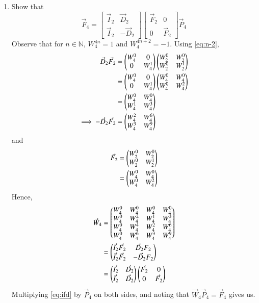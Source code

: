 \documentclass[journal,12pt,twocolumn]{IEEEtran}
\renewcommand\thesection{\arabic{section}}
\begin{document}
\begin{enumerate}[label=\arabic*.,ref=\thesection.\theenumi]
	\item Show that 
	\begin{equation}
		\vec{F}_{4}=
		\begin{bmatrix}
			\vec{I}_{2} & \vec{D}_{2} \\
			\vec{I}_{2} & -\vec{D}_{2}
		\end{bmatrix}
		\begin{bmatrix}
			\vec{F}_{2} & 0 \\
			0 & \vec{F}_{2}
		\end{bmatrix}
		\vec{P}_{4}
	\end{equation}
	\solution Observe that for $n \in \mathbb{N}$, $W_4^{4n} = 1$ and $W_4^{4n + 2} = -1$. Using \eqref{eq:n-2},
	\begin{align}
		\vec{D}_2\vec{F}_2 &= \begin{pmatrix}W_{4}^{0} & 0 \\ 0 & W_{4}^{1}\end{pmatrix}\begin{pmatrix}W_{2}^{0} & W_{2}^{0} \\ W_{2}^{0} & W_{2}^{1}\end{pmatrix} \\
		&= \begin{pmatrix}W_{4}^{0} & 0 \\ 0 & W_{4}^{1}\end{pmatrix}\begin{pmatrix}W_{4}^{0} & W_{4}^{0} \\ W_{4}^{0} & W_{4}^{2}\end{pmatrix} \\
		&= \begin{pmatrix}W_{4}^{0} & W_{4}^{0} \\ W_{4}^{1} & W_{4}^{3}\end{pmatrix} \label{eq:fft-df1} \\
		\implies -\vec{D}_2\vec{F}_2 &= \begin{pmatrix}W_{4}^{2} & W_{4}^{6} \\ W_{4}^{3} & W_{4}^{9}\end{pmatrix} \label{eq:fft-df2}
	\end{align}
	and
	\begin{align}
		\vec{F}_2 &= \begin{pmatrix}W_{2}^{0} & W_{2}^{0} \\ W_{2}^{0} & W_{2}^{1}\end{pmatrix} \\
		&= \begin{pmatrix}W_{4}^{0} & W_{4}^{0} \\ W_{4}^{0} & W_{4}^{2}\end{pmatrix}
	\end{align}
	Hence,
	\begin{align}
		\vec{W}_4 &= \begin{pmatrix}W_{4}^{0} & W_{4}^{0} & W_{4}^{0} & W_{4}^{0} \\
			W_{4}^{0} & W_{4}^{2} & W_{4}^{1} & W_{4}^{3} \\
			W_{4}^{0} & W_{4}^{4} & W_{4}^{2} & W_{4}^{6} \\
			W_{4}^{0} & W_{4}^{6} & W_{4}^{3} & W_{4}^{9} 
		\end{pmatrix} \label{eq:fft-permutation} \\
		&= \begin{pmatrix}\vec{I}_2\vec{F}_2 & \vec{D}_2{F}_2 \\ \vec{I}_2\vec{F}_2 & -\vec{D}_2{F}_2\end{pmatrix} \\
		&= \begin{pmatrix}\vec{I}_2 & \vec{D}_2 \\ \vec{I}_2 & \vec{D}_2\end{pmatrix}\begin{pmatrix}\vec{F}_2 & 0 \\ 0 & \vec{F}_2\end{pmatrix}
		\label{eq:ifd}
	\end{align}
	Multiplying \eqref{eq:ifd} by $\vec{P}_4$ on both sides, and noting that $\vec{W}_4\vec{P}_4 = \vec{F}_4$ gives us.
	

\end{enumerate}
\end{document}
